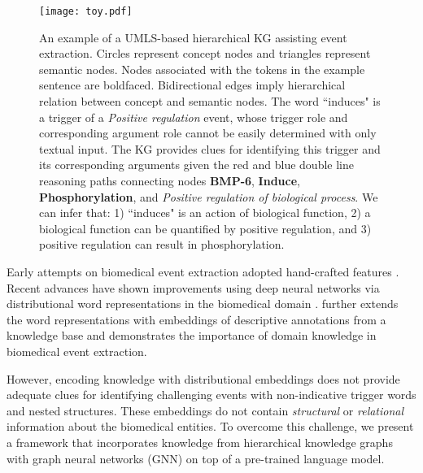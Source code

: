 \documentclass[11pt,a4paper]{article}
\begin{document}
\begin{figure}
  \centering
  \texttt{[image: toy.pdf]}
\caption{An example of a UMLS-based hierarchical KG assisting event extraction. Circles represent concept nodes and triangles represent semantic nodes. Nodes associated with the tokens in the example sentence are boldfaced. Bidirectional edges imply hierarchical relation between concept and semantic nodes.  The word ``induces" is a trigger of a \textit{Positive regulation} event, whose trigger role and corresponding argument role cannot be easily determined with only textual input. The KG provides clues for identifying this trigger and its corresponding arguments given the red and blue double line reasoning paths connecting nodes \textbf{BMP-6}, \textbf{Induce}, \textbf{Phosphorylation}, and \textit{Positive regulation of biological process}. We can infer that: 1) ``induces" is an action of biological function, 2) a biological function can be quantified by positive regulation, and 3) positive regulation can result in phosphorylation.}
\label{toy_example}
  \vspace{-1.5em}
\end{figure} 





Early attempts on biomedical event extraction adopted hand-crafted features \cite{bjorne-etal-2009-extracting, bjorne-salakoski-2011-generalizing, riedel2011fast, venugopal2014relieving}. Recent advances have shown improvements using deep neural networks via distributional word representations in the biomedical domain \cite{moen2013distributional, rao2017biomedical, bjorne-salakoski-2018-biomedical, shafieibavani2019global}.  further extends the word representations with embeddings of descriptive annotations from a knowledge base and demonstrates the importance of domain knowledge in biomedical event extraction. 

However, encoding knowledge with distributional embeddings does not provide adequate clues for identifying challenging events with non-indicative trigger words and nested structures. These embeddings do not contain \textit{structural} or \textit{relational} information about the biomedical entities. To overcome this challenge, we present a framework that incorporates knowledge from hierarchical knowledge graphs with graph neural networks (GNN) on top of a pre-trained language model.
\end{document}
